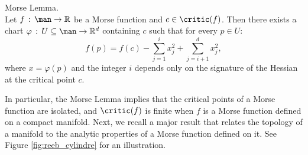 \begin{lemma}{Morse Lemma.}\label{lem:morse}\\
Let $f\,:\,\man\rightarrow \mathbb{R}$ be a Morse function and $c\in\critic(f)$. Then there exists a chart $\varphi\,:\,U\subseteq\man\rightarrow \mathbb{R}^d$ containing $c$ such that for every $p\in U$:
    $$f(p)=f(c)-\sum_{j=1}^ix_j^2+\sum_{j=i+1}^dx_j^2,$$
    where $x=\varphi(p)$ and the integer $i$ depends only on the signature of the Hessian at the critical point $c$.
\end{lemma}

In particular, the Morse Lemma implies that the critical points of a Morse function are isolated, and $\critic(f)$ is finite when $f$ is a Morse function defined on a compact manifold.
%
Next, we recall a major result that relates the topology of a manifold to the analytic properties of a Morse function defined on it. See Figure \ref{fig:reeb_cylindre} for an illustration.

